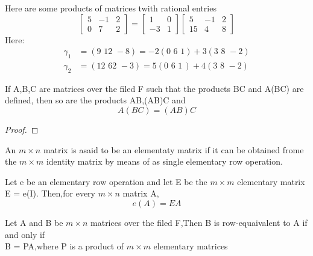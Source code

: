 \begin{example}
	Here are some products of matrices twith rational entries
	\[
		\begin{bmatrix}
			5 & -1 & 2 \\
			0 & 7  & 2
		\end{bmatrix} = \begin{bmatrix}
			1  & 0 \\
			-3 & 1
		\end{bmatrix} \begin{bmatrix} 5  & -1 & 2 \\
                15 & 4  & 8
		\end{bmatrix}
	\]
	Here:
	\[
		\begin{aligned}
			\gamma_{1} & =(9\,\,12\,\, -8) = -2(0\,\,6\,\,1)+3(3\,\,8\,\,-2)    \\
			\gamma_{2} & = (12\,\,62\,\,-3) = 5(0\,\,6\,\,1\,) +4(3\,\,8\,\,-2)
		\end{aligned}
	\]

\end{example}

\begin{theorem}
	If A,B,C are matrices over the filed F such that the products BC and A(BC) are defined, then so are the products AB,(AB)C and \[
		A(BC)=(AB)C
	\]
\end{theorem}


\begin{proof}

\end{proof}


\begin{definition}

	An \textbf{ $m \times n $} matrix is asaid to be an elementaty matrix if it can be obtained frome the $m \times m$ identity matrix by means of as single elementary row operation.

\end{definition}

\begin{theorem}
	Let e be an elementary row operation and let E be the $m \times m$ elementary matrix E = e(I). Then,for every $m \times n$ matrix A, \[
		e(A) = EA
	\]
\end{theorem}

\begin{corollary}
	Let A and B be $m \times n$ matrices over the filed F,Then B is row-equaivalent to A if and only if \\ B = PA,where P is a product of $m \times m$ elementary matrices
\end{corollary}

